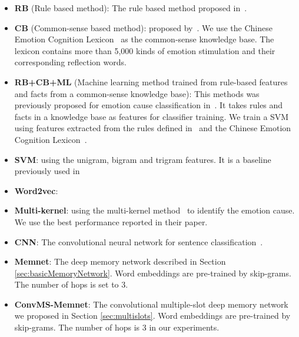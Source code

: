 \documentclass[11pt,letterpaper]{article}
\begin{document}
\begin{CJK*}{UTF8}{gbsn}
\begin{itemize}
\item \textbf{RB} (Rule based method): The rule based method proposed in~\cite{lee2010text}.
\item \textbf{CB} (Common-sense based method): 
proposed by~\cite{russo2011emocause}. We use the Chinese Emotion Cognition Lexicon~\cite{Xu2013Lexicon} as the common-sense knowledge base. 
The lexicon contains more than 5,000 kinds of emotion stimulation and their corresponding reflection words.
\item \textbf{RB+CB+ML} (Machine learning method trained from rule-based features and facts from a common-sense knowledge base): This methods was previously proposed for emotion cause classification in~\cite{chen2010emotion}. It takes rules and facts in a knowledge base as features for classifier training. We train a SVM using features extracted from the rules defined in~\cite{lee2010text} and the Chinese Emotion Cognition Lexicon~\cite{Xu2013Lexicon}. 
\item \textbf{SVM}:  using the unigram, bigram and trigram features.
It is a baseline previously used in~\cite{li2014text,gui2016event}
\item \textbf{Word2vec}: 
\item \textbf{Multi-kernel}:  using the multi-kernel method~\cite{gui2016event} to identify the emotion cause. We use the best performance reported in their paper.
\item \textbf {CNN}: The convolutional neural network for sentence classification~\cite{kim2014con}.
\item \textbf {Memnet}: The deep memory network described in Section \ref{sec:basicMemoryNetwork}. Word embeddings are pre-trained by skip-grams. The number of hops is set to 3.
\item \textbf {ConvMS-Memnet}: The convolutional multiple-slot deep memory network we proposed in Section \ref{sec:multislots}. Word embeddings are pre-trained by skip-grams. The number of hops is 3 in our experiments.
\end{itemize}




\end{CJK*}
\end{document}

